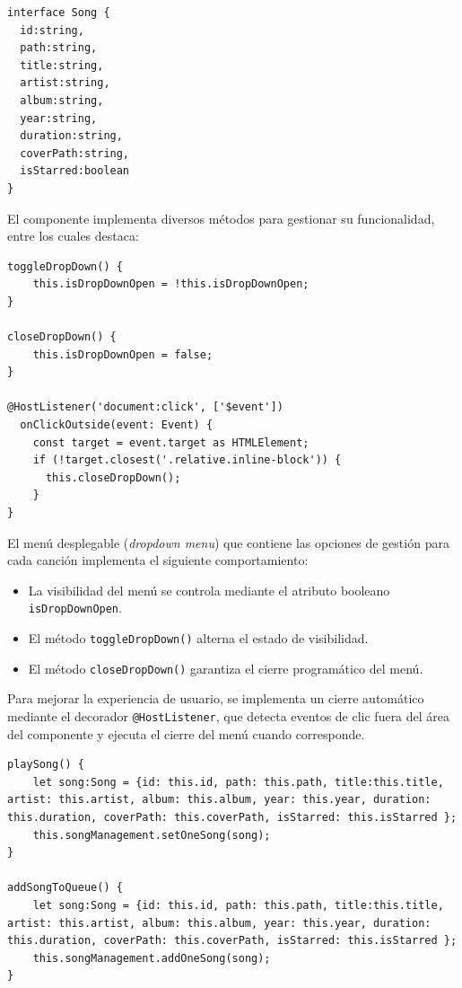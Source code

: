 \documentclass[11pt, a4paper]{article}
\begin{document}
                \begin{lstlisting}[caption={Song}]
interface Song {
  id:string,
  path:string,
  title:string,
  artist:string,
  album:string,
  year:string,
  duration:string,
  coverPath:string,
  isStarred:boolean
}
                \end{lstlisting}

                El componente implementa diversos métodos para gestionar su funcionalidad, entre los cuales destaca:

                \begin{lstlisting}[caption={Dropdown menu}]
toggleDropDown() {
    this.isDropDownOpen = !this.isDropDownOpen;
}

closeDropDown() {
    this.isDropDownOpen = false;
}

@HostListener('document:click', ['$event'])
  onClickOutside(event: Event) {
    const target = event.target as HTMLElement;
    if (!target.closest('.relative.inline-block')) {
      this.closeDropDown();
    }
}
                \end{lstlisting}

                El menú desplegable (\textit{dropdown menu}) que contiene las opciones de gestión para cada canción implementa el siguiente comportamiento:

                \begin{itemize}
                  \item La visibilidad del menú se controla mediante el atributo booleano \texttt{isDropDownOpen}.
                  \item El método \texttt{toggleDropDown()} alterna el estado de visibilidad.
                  \item El método \texttt{closeDropDown()} garantiza el cierre programático del menú.
                \end{itemize}

                Para mejorar la experiencia de usuario, se implementa un cierre automático mediante el decorador \texttt{@HostListener}, que detecta eventos de clic fuera del área del componente y ejecuta el cierre del menú cuando corresponde.

                \begin{lstlisting}[caption={playSong() y addSongToQueue()}]
playSong() {
    let song:Song = {id: this.id, path: this.path, title:this.title, artist: this.artist, album: this.album, year: this.year, duration: this.duration, coverPath: this.coverPath, isStarred: this.isStarred };
    this.songManagement.setOneSong(song);
}

addSongToQueue() {
    let song:Song = {id: this.id, path: this.path, title:this.title, artist: this.artist, album: this.album, year: this.year, duration: this.duration, coverPath: this.coverPath, isStarred: this.isStarred };
    this.songManagement.addOneSong(song);
}
                \end{lstlisting}
\end{document}
